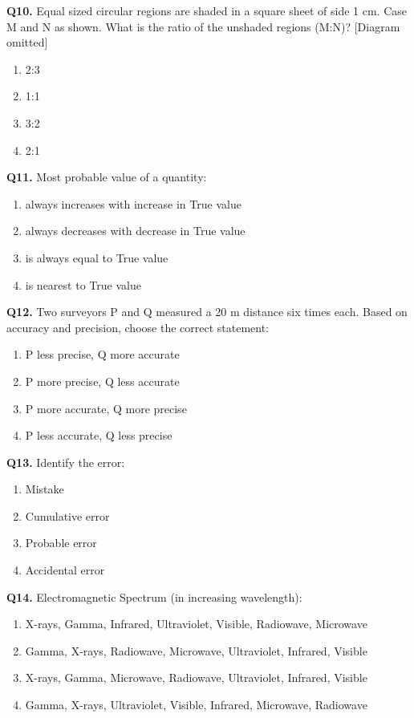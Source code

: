 \documentclass[12pt,a4paper]{article}
\begin{document}
\textbf{Q10.} Equal sized circular regions are shaded in a square sheet of side 1 cm. Case M and N as shown. What is the ratio of the unshaded regions (M:N)? [Diagram omitted]  
\begin{enumerate}
    \item 2:3
    \item 1:1
    \item 3:2
    \item 2:1
\end{enumerate}

\textbf{Q11.} Most probable value of a quantity:  
\begin{enumerate}
    \item always increases with increase in True value
    \item always decreases with decrease in True value
    \item is always equal to True value
    \item is nearest to True value
\end{enumerate}

\textbf{Q12.} Two surveyors P and Q measured a 20 m distance six times each. Based on accuracy and precision, choose the correct statement:  
\begin{enumerate}
    \item P less precise, Q more accurate
    \item P more precise, Q less accurate
    \item P more accurate, Q more precise
    \item P less accurate, Q less precise
\end{enumerate}

\textbf{Q13.} Identify the error:  
\begin{enumerate}
    \item Mistake
    \item Cumulative error
    \item Probable error
    \item Accidental error
\end{enumerate}

\textbf{Q14.} Electromagnetic Spectrum (in increasing wavelength):  
\begin{enumerate}
    \item X-rays, Gamma, Infrared, Ultraviolet, Visible, Radiowave, Microwave
    \item Gamma, X-rays, Radiowave, Microwave, Ultraviolet, Infrared, Visible
    \item X-rays, Gamma, Microwave, Radiowave, Ultraviolet, Infrared, Visible
    \item Gamma, X-rays, Ultraviolet, Visible, Infrared, Microwave, Radiowave
\end{enumerate}
\end{document}
